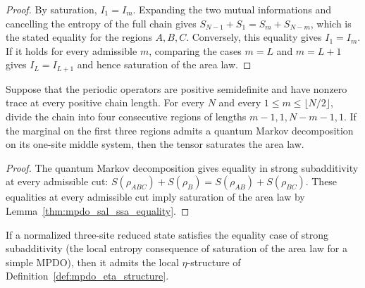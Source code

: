 \begin{proof}
    \leanok
    By saturation, $I_1=I_m$. Expanding the two mutual informations and
    cancelling the entropy of the full chain gives
    $S_{N-1}+S_1=S_m+S_{N-m}$, which is the stated equality for the regions
    $A,B,C$. Conversely, this equality gives $I_1=I_m$. If it holds for every
    admissible $m$, comparing the cases $m=L$ and $m=L+1$ gives
    $I_L=I_{L+1}$ and hence saturation of the area law.
\end{proof}

\begin{lemma}
    \label{thm:mpdo_all_cut_markov_implies_sal}
    \leanok
    Suppose that the periodic operators are positive semidefinite and have
    nonzero trace at every positive chain length. For every $N$ and every
    $1\leq m\leq\lfloor N/2\rfloor$, divide the chain into four consecutive
    regions of lengths $m-1,1,N-m-1,1$. If the marginal on the first three
    regions admits a quantum Markov decomposition on its one-site middle
    system, then the tensor saturates the area law.
\end{lemma}

\begin{proof}\leanok
    The quantum Markov decomposition gives equality in strong subadditivity
    at every admissible cut:
    $S(\rho_{ABC})+S(\rho_B)=S(\rho_{AB})+S(\rho_{BC})$.
    These equalities at every admissible cut imply saturation of the area law
    by Lemma~\ref{thm:mpdo_sal_ssa_equality}.
\end{proof}

\begin{lemma}
    \label{thm:sal_implies_eta_structure}
    \leanok
    If a normalized three-site reduced state satisfies the equality case of
    strong subadditivity (the local entropy consequence of saturation of
    the area law for a simple MPDO), then it admits the local $\eta$-structure of
    Definition~\ref{def:mpdo_eta_structure}.
\end{lemma}

